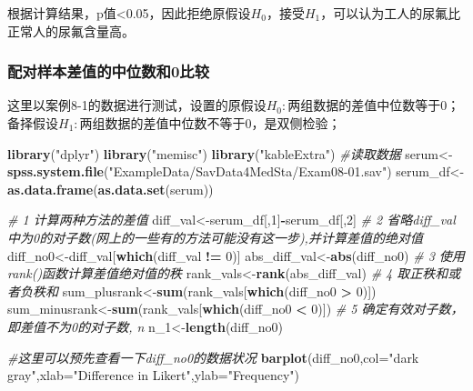 \documentclass[
]{article}
\newenvironment{Shaded}{\begin{snugshade}}{\end{snugshade}}
\newcommand{\CommentTok}[1]{\textcolor[rgb]{0.56,0.35,0.01}{\textit{#1}}}
\newcommand{\DataTypeTok}[1]{\textcolor[rgb]{0.13,0.29,0.53}{#1}}
\newcommand{\DecValTok}[1]{\textcolor[rgb]{0.00,0.00,0.81}{#1}}
\newcommand{\KeywordTok}[1]{\textcolor[rgb]{0.13,0.29,0.53}{\textbf{#1}}}
\newcommand{\NormalTok}[1]{#1}
\newcommand{\OperatorTok}[1]{\textcolor[rgb]{0.81,0.36,0.00}{\textbf{#1}}}
\newcommand{\StringTok}[1]{\textcolor[rgb]{0.31,0.60,0.02}{#1}}
\begin{document}
根据计算结果，p值\textless0.05，因此拒绝原假设\(H_0\)，接受\(H_1\)，可以认为工人的尿氟比正常人的尿氟含量高。

\hypertarget{ux914dux5bf9ux6837ux672cux5deeux503cux7684ux4e2dux4f4dux6570ux548c0ux6bd4ux8f83}{%
\subsubsection{配对样本差值的中位数和0比较}\label{ux914dux5bf9ux6837ux672cux5deeux503cux7684ux4e2dux4f4dux6570ux548c0ux6bd4ux8f83}}

这里以案例8-1的数据进行测试，设置的原假设\(H_0:\)两组数据的差值中位数等于0；备择假设\(H_1:\)两组数据的差值中位数不等于0，是双侧检验；

\begin{Shaded}
\begin{Highlighting}[]
\KeywordTok{library}\NormalTok{(}\StringTok{"dplyr"}\NormalTok{)}
\KeywordTok{library}\NormalTok{(}\StringTok{"memisc"}\NormalTok{)}
\KeywordTok{library}\NormalTok{(}\StringTok{"kableExtra"}\NormalTok{)}
\CommentTok{#读取数据}
\NormalTok{serum<-}\KeywordTok{spss.system.file}\NormalTok{(}\StringTok{"ExampleData/SavData4MedSta/Exam08-01.sav"}\NormalTok{)}
\NormalTok{serum_df<-}\KeywordTok{as.data.frame}\NormalTok{(}\KeywordTok{as.data.set}\NormalTok{(serum))}

\CommentTok{# 1 计算两种方法的差值}
\NormalTok{diff_val<-serum_df[,}\DecValTok{1}\NormalTok{]}\OperatorTok{-}\NormalTok{serum_df[,}\DecValTok{2}\NormalTok{]}
\CommentTok{# 2 省略diff_val中为0的对子数(网上的一些有的方法可能没有这一步),并计算差值的绝对值}
\NormalTok{diff_no0<-diff_val[}\KeywordTok{which}\NormalTok{(diff_val }\OperatorTok{!=}\StringTok{ }\DecValTok{0}\NormalTok{)]}
\NormalTok{abs_diff_val<-}\KeywordTok{abs}\NormalTok{(diff_no0)}
\CommentTok{# 3 使用rank()函数计算差值绝对值的秩}
\NormalTok{rank_vals<-}\KeywordTok{rank}\NormalTok{(abs_diff_val)}
\CommentTok{# 4 取正秩和或者负秩和}
\NormalTok{sum_plusrank<-}\KeywordTok{sum}\NormalTok{(rank_vals[}\KeywordTok{which}\NormalTok{(diff_no0 }\OperatorTok{>}\StringTok{ }\DecValTok{0}\NormalTok{)])}
\NormalTok{sum_minusrank<-}\KeywordTok{sum}\NormalTok{(rank_vals[}\KeywordTok{which}\NormalTok{(diff_no0 }\OperatorTok{<}\StringTok{ }\DecValTok{0}\NormalTok{)])}
\CommentTok{# 5 确定有效对子数，即差值不为0的对子数, n}
\NormalTok{n_}\DecValTok{1}\NormalTok{<-}\KeywordTok{length}\NormalTok{(diff_no0)}

\CommentTok{#这里可以预先查看一下diff_no0的数据状况}
\KeywordTok{barplot}\NormalTok{(diff_no0,}\DataTypeTok{col=}\StringTok{"dark gray"}\NormalTok{,}\DataTypeTok{xlab=}\StringTok{"Difference in Likert"}\NormalTok{,}\DataTypeTok{ylab=}\StringTok{"Frequency"}\NormalTok{)}


\end{Highlighting}
\end{Shaded}
\end{document}

